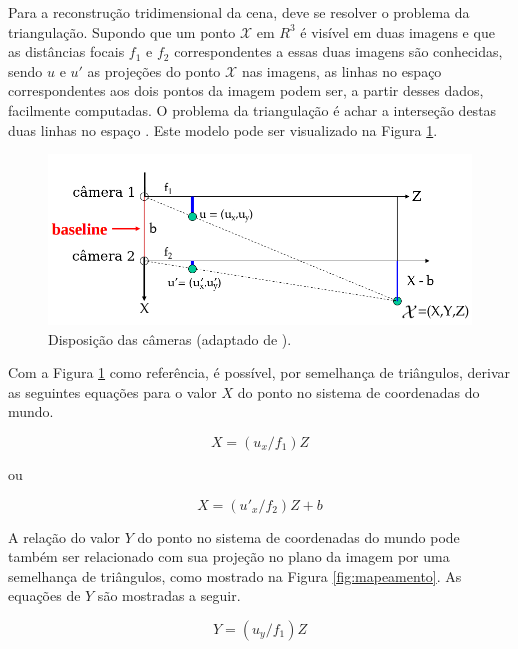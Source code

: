 {Para a reconstrução tridimensional da cena, deve se resolver o problema da
triangulação. Supondo que um ponto $\mathcal{X}$ em $R^3$ é visível em duas
imagens e que as distâncias focais $f_1$ e $f_2$ correspondentes a essas duas
imagens são conhecidas, sendo $u$ e $u'$ as projeções do ponto $\mathcal{X}$ nas
imagens, as linhas no espaço correspondentes aos dois pontos da imagem podem
ser, a partir desses dados, facilmente computadas. O problema da triangulação é
achar a interseção destas duas linhas no espaço \cite{hartley1997triangulation}.
Este modelo pode ser visualizado na Figura \ref{fig:disp_cameras}.

\begin{figure}[h!]
\centering
\includegraphics[width=.72\linewidth]{figs/TG_triangulation_pdf_washington_pt2.png}
\caption{Disposição das câmeras (adaptado de \cite{stereovision-washington-pdf}).}
\label{fig:disp_cameras}
\end{figure}


Com a Figura \ref{fig:disp_cameras} como referência, é possível, por semelhança
de triângulos, derivar as seguintes equações para o valor $X$ do ponto no
sistema de coordenadas do mundo.

\begin{equation}
X = (u_x/f_1)  Z
\label{eq:3d_realX1}
\end{equation}   

ou

\begin{equation}
X = (u'_x/f_2)  Z + b
\label{eq:3d_realX2}
\end{equation}  

A relação do valor $Y$ do ponto no sistema de coordenadas do mundo pode também
ser relacionado com sua projeção no plano da imagem por uma semelhança de
triângulos, como mostrado na Figura \ref{fig:mapeamento}. As equações de $Y$ são
mostradas a seguir.

\begin{equation}
Y = (u_y/f_1) Z
\label{eq:3d_realY1}
\end{equation}      

}
